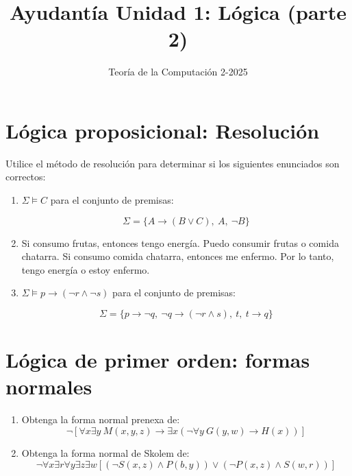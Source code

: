 \documentclass{article}
\begin{document}
\title{Ayudantía Unidad 1: Lógica (parte 2)}
\author{Teoría de la Computación 2-2025}
\date{}

\maketitle

\section{Lógica proposicional: Resolución}
Utilice el método de resolución para determinar si los siguientes enunciados son
correctos:

\begin{enumerate}
  \item $\Sigma \vDash C$ para el conjunto de premisas:

$$\Sigma = \{A \rightarrow (B \vee C),\ A,\ \neg B\}$$

  \item Si consumo frutas, entonces tengo energía. Puedo consumir frutas o
        comida chatarra. Si consumo comida chatarra, entonces me enfermo. Por lo
        tanto, tengo energía o estoy enfermo.

  \item $\Sigma \vDash p \rightarrow (\neg r \land \neg s)$ para el conjunto de
        premisas:

$$\Sigma = \{p \rightarrow \neg q,\ \neg q \rightarrow (\neg r \land s), \ t,\ t\rightarrow q\}$$
\end{enumerate}


\section{Lógica de primer orden: formas normales}

\begin{enumerate}
  \item Obtenga la forma normal prenexa de:
  $$\neg[\forall x \exists y\ M(x, y, z) \rightarrow \exists x (\neg \forall y\ G(y, w) \rightarrow H(x))]$$

  \item Obtenga la forma normal de Skolem de:
  $$\neg \forall x \exists r \forall y \exists z \exists w [(\neg S(x, z) \land P(b, y)) \vee (\neg P(x, z) \land S(w, r))]$$


\end{enumerate}
\end{document}

